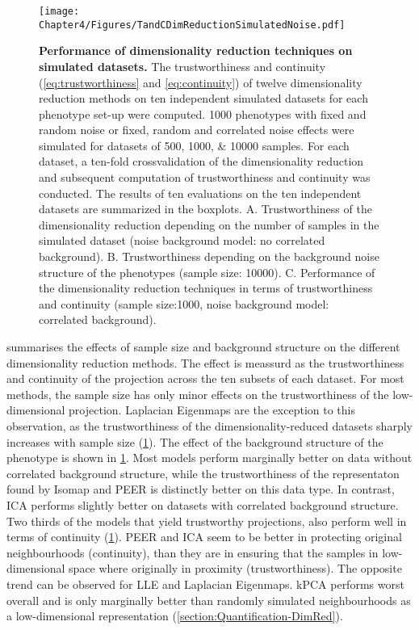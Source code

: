 \begin{figure}[hbtp]
	\centering
	\texttt{[image: Chapter4/Figures/TandCDimReductionSimulatedNoise.pdf]}
	\caption[\textbf{Performance of dimensionality reduction techniques on simulated datasets.}]{\textbf{Performance of dimensionality reduction techniques on simulated datasets.} The trustworthiness and continuity (\cref{eq:trustworthiness} and \cref{eq:continuity}) of twelve dimensionality reduction methods on ten independent simulated datasets for each phenotype set-up were computed.  \num{1000} phenotypes with fixed and random noise or fixed, random and correlated noise effects were simulated for datasets of \numlist{500;1000; 10000} samples. For each dataset, a ten-fold crossvalidation of the dimensionality reduction and subsequent computation of trustworthiness and continuity was conducted. The results of ten evaluations on the ten independent datasets are summarized in the boxplots. A. Trustworthiness of the dimensionality reduction depending on the number of samples in the simulated dataset (noise background model: no correlated background). B. Trustworthiness depending on the background noise structure of the phenotypes (sample size: \num{10000}). C. Performance of the dimensionality reduction techniques in terms of trustworthiness and continuity (sample size:\num{1000}, noise background model: correlated background).}
	 	\label{fig:TaC-noise}
\end{figure}


 summarises the effects of sample size and background structure on the different dimensionality reduction methods. The effect is meassurd as the trustworthiness and continuity of the projection across the ten subsets of each dataset. For most methods, the sample size has only minor effects on the trustworthiness of the low-dimensional projection. Laplacian Eigenmaps are the exception to this observation, as the trustworthiness of the dimensionality-reduced datasets sharply increases with sample size (\cref{fig:TaC-noise}). The effect of the background structure of the phenotype is shown in \cref{fig:TaC-noise}. Most models perform marginally better on data without correlated background structure, while the trustworthiness of the representaton found by Isomap and PEER is distinctly better on this data type. In contrast, ICA performs slightly better on datasets with correlated background structure. Two thirds of the models that yield trustworthy projections, also perform well in terms of continuity (\cref{fig:TaC-noise}). PEER and ICA seem to be better in protecting original neighbourhoods (continuity), than they are in ensuring that the samples in low-dimensional space where originally in proximity (trustworthiness). The opposite trend can be observed for LLE and Laplacian Eigenmaps. kPCA performs worst overall and is only marginally better than randomly simulated neighbourhoods as a low-dimensional representation (\cref{section:Quantification-DimRed}).

